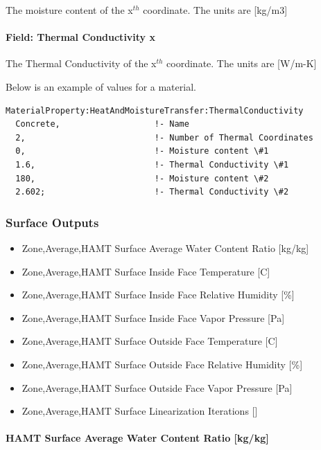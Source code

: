 The moisture content of the x\(^{th}\) coordinate. The units are {[}kg/m3{]}

\paragraph{Field: Thermal Conductivity x}\label{field-thermal-conductivity-x-1}

The Thermal Conductivity of the x\(^{th}\) coordinate. The units are {[}W/m-K{]}

Below is an example of values for a material.

\begin{lstlisting}
MaterialProperty:HeatAndMoistureTransfer:ThermalConductivity
  Concrete,                   !- Name
  2,                          !- Number of Thermal Coordinates
  0,                          !- Moisture content \#1
  1.6,                        !- Thermal Conductivity \#1
  180,                        !- Moisture content \#2
  2.602;                      !- Thermal Conductivity \#2
\end{lstlisting}

\subsubsection{Surface Outputs}\label{surface-outputs}

\begin{itemize}
\item
  Zone,Average,HAMT Surface Average Water Content Ratio {[}kg/kg{]}
\item
  Zone,Average,HAMT Surface Inside Face Temperature {[}C{]}
\item
  Zone,Average,HAMT Surface Inside Face Relative Humidity {[}\%{]}
\item
  Zone,Average,HAMT Surface Inside Face Vapor Pressure {[}Pa{]}
\item
  Zone,Average,HAMT Surface Outside Face Temperature {[}C{]}
\item
  Zone,Average,HAMT Surface Outside Face Relative Humidity {[}\%{]}
\item
  Zone,Average,HAMT Surface Outside Face Vapor Pressure {[}Pa{]}
\item
  Zone,Average,HAMT Surface Linearization Iterations {[}{]}
\end{itemize}

\paragraph{HAMT Surface Average Water Content Ratio {[}kg/kg{]}}\label{hamt-surface-average-water-content-ratio-kgkg}

